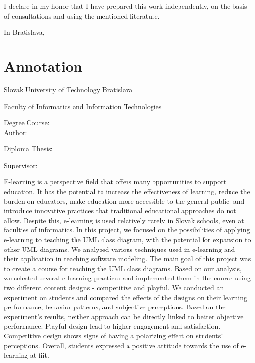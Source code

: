 \newpage
\thispagestyle{empty}
\vspace*{\fill}
I declare in my honor that I have prepared this work independently, on the basis of consultations and using the mentioned literature.

\vspace{2cm}
\mbox{}
In Bratislava, \myDate \hfill \myName
\mbox{}




\newpage
\thispagestyle{empty}
\mbox{}
\newpage

\thispagestyle{empty}




\thispagestyle{empty}
\section*{Annotation}

\begin{minipage}[t]{1\columnwidth}%
Slovak University of Technology Bratislava 

Faculty of Informatics and Information Technologies

Degree Course: \myStudyProgram\\

Author: \myName

Diploma Thesis: \myTitle

Supervisor: \mySupervisor

\myDate%
\end{minipage}

\bigskip{}

E-learning is a perspective field that offers many opportunities to support education. It has the potential to increase the effectiveness of learning, reduce the burden on educators, make education more accessible to the general public, and introduce innovative practices that traditional educational approaches do not allow. Despite this, e-learning is used relatively rarely in Slovak schools, even at faculties of informatics. In this project, we focused on the possibilities of applying e-learning to teaching the UML class diagram, with the potential for expansion to other UML diagrams. We analyzed various techniques used in e-learning and their application in teaching software modeling. The main goal of this project was to create a course for teaching the UML class diagrams. Based on our analysis, we selected several e-learning practices and implemented them in the course using two different content designs - competitive and playful. We conducted an experiment on students and compared the effects of the designs on their learning performance, behavior patterns, and subjective perceptions. Based on the experiment's results, neither approach can be directly linked to better objective performance. Playful design lead to higher engagement and satisfaction. Competitive design shows signs of having a polarizing effect on students' perceptions.
Overall, students expressed a positive attitude towards the use of e-learning at \ac{fiit}. %


